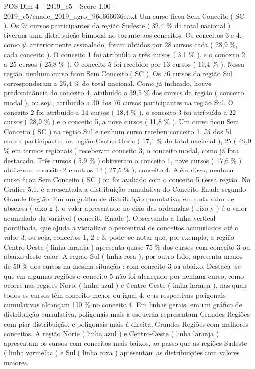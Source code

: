 \begin{textsample}{POS Dim 4 – 2019\_c5 – Score 1.00 – 2019\_c5/enade\_2019\_agro\_96d666036e.txt}
Um curso ficou Sem Conceito ( SC ).
Os 97 cursos participantes da região Sudeste ( 32,4 \% do total nacional ) tiveram uma distribuição bimodal no tocante aos conceitos.
Os conceitos 3 e 4, como já anteriormente assinalado, foram obtidos por 28 cursos cada ( 28,9 \%, cada conceito ).
O conceito 1 foi atribuído a três cursos ( 3,1 \% ), e o conceito 2, a 25 cursos ( 25,8 \% ).
O conceito 5 foi recebido por 13 cursos ( 13,4 \% ).
Nessa região, nenhum curso ficou Sem Conceito ( SC ).
Os 76 cursos da região Sul corresponderam a 25,4 \% do total nacional.
Como já indicado, houve predominância do conceito 4, atribuído a 39,5 \% dos cursos da região ( conceito modal ), ou seja, atribuído a 30 dos 76 cursos participantes na região Sul.
O conceito 2 foi atribuído a 14 cursos ( 18,4 \% ), o conceito 3 foi atribuído a 22 cursos ( 28,9 \% ) e o conceito 5, a nove cursos ( 11,8 \% ).
Um curso ficou Sem Conceito ( SC ) na região Sul e nenhum curso recebeu conceito 1.
Já dos 51 cursos participantes na região Centro-Oeste ( 17,1 \% do total nacional ), 25 ( 49,0 \% em termos regionais ) receberam conceito 3, o conceito modal, como já fora destacado.
Três cursos ( 5,9 \% ) obtiveram o conceito 1, nove cursos ( 17,6 \% ) obtiveram conceito 2 e outros 14 ( 27,5 \% ), conceito 4.
Além disso, nenhum curso ficou Sem Conceito ( SC ) ou foi avaliado com o conceito 5 nessa região.
No Gráfico 5.1, é apresentada a distribuição cumulativa do Conceito Enade segundo Grande Região.
Em um gráfico de distribuição cumulativa, em cada valor de abscissa ( eixo x ), o valor apresentado no eixo das ordenadas ( eixo y ) é o valor acumulado da variável ( conceito Enade ).
Observando a linha vertical pontilhada, que ajuda a visualizar o percentual de conceitos acumulados até o valor 3, ou seja, conceitos 1, 2 e 3, pode -se notar que, por exemplo, a região Centro-Oeste ( linha laranja ) apresenta quase 75 \% dos cursos com conceito 3 ou abaixo deste valor.
A região Sul ( linha rosa ), por outro lado, apresenta menos de 50 \% dos cursos na mesma situação : com conceito 3 ou abaixo.
Destaca -se que em algumas regiões o conceito 5 não foi alcançado por nenhum curso, como ocorre nas regiões Norte ( linha azul ) e Centro-Oeste ( linha laranja ), nas quais todos os cursos têm conceito menor ou igual 4, e as respectivas poligonais cumulativas alcançam 100 \% no conceito 4.
Em linhas gerais, em um gráfico de distribuição cumulativa, poligonais mais à esquerda representam Grandes Regiões com pior distribuição, e poligonais mais à direita, Grandes Regiões com melhores conceitos.
A região Norte ( linha azul ) e Centro-Oeste ( linha laranja ) apresentam os cursos com conceitos mais baixos, ao passo que as regiões Sudeste ( linha vermelha ) e Sul ( linha roxa ) apresentam as distribuições com valores maiores.

\end{textsample}
